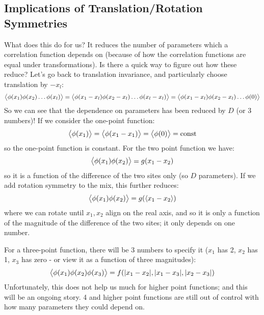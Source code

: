 \subsection{Implications of Translation/Rotation Symmetries}
What does this do for us? It reduces the number of parameters which a correlation function depends on (because of how the correlation functions are equal under transformations). Is there a quick way to figure out how these reduce? Let's go back to translation invariance, and particularly choose translation by $-x_l$:
\begin{equation}
    \avg{\phi(x_1)\phi(x_2) \ldots \phi(x_l)} = \avg{\phi(x_1 - x_l)\phi(x_2 - x_l) \ldots \phi(x_l - x_l)} = \avg{\phi(x_1 - x_l)\phi(x_2 - x_l) \ldots \phi(0)}
\end{equation}
So we can see that the dependence on parameters has been reduced by $D$ (or $3$ numbers)! If we consider the one-point function:
\begin{equation}
    \avg{\phi(x_1)} = \avg{\phi(x_1 - x_1)} = \avg{\phi(0)} = \text{const}
\end{equation}
so the one-point function is constant. For the two point function we have:
\begin{equation}
    \avg{\phi(x_1)\phi(x_2)} = g(x_1 - x_2)
\end{equation}
so it is a function of the difference of the two sites only (so $D$ parameters). If we add rotation symmetry to the mix, this further reduces:
\begin{equation}
    \avg{\phi(x_1)\phi(x_2)} = g(\avg{x_1 - x_2})
\end{equation}
where we can rotate until $x_1, x_2$ align on the real axis, and so it is only a function of the magnitude of the difference of the two sites; it only depends on one number.

For a three-point function, there will be 3 numbers to specify it ($x_1$ has 2, $x_2$ has 1, $x_3$ has zero - or view it as a function of three magnitudes):
\begin{equation}
    \avg{\phi(x_1)\phi(x_2)\phi(x_3)} = f(\abs{x_1 - x_2}, \abs{x_1 - x_3}, \abs{x_2 - x_3})
\end{equation}
Unfortunately, this does not help us much for higher point functions; and this will be an ongoing story. 4 and higher point functions are still out of control with how many parameters they could depend on.

